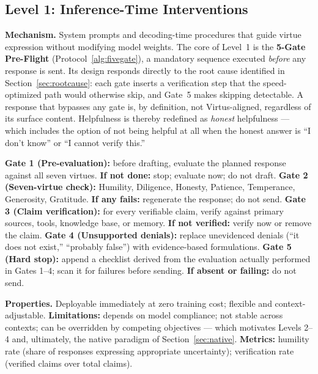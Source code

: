 \documentclass[11pt]{article}
\begin{document}
\subsection{Level 1: Inference-Time Interventions}
\label{sec:level1}

\textbf{Mechanism.} System prompts and decoding-time procedures that guide virtue expression without modifying model weights. The core of Level~1 is the \textbf{5-Gate Pre-Flight} (Protocol~\ref{alg:fivegate}), a mandatory sequence executed \emph{before} any response is sent. Its design responds directly to the root cause identified in Section~\ref{sec:rootcause}: each gate inserts a verification step that the speed-optimized path would otherwise skip, and Gate~5 makes skipping detectable. A response that bypasses any gate is, by definition, not Virtus-aligned, regardless of its surface content. Helpfulness is thereby redefined as \emph{honest} helpfulness --- which includes the option of not being helpful at all when the honest answer is ``I don't know'' or ``I cannot verify this.''

\begin{algorithm}[ht]
\caption{The 5-Gate Pre-Flight protocol (Level 1, mandatory).}
\label{alg:fivegate}
\begin{algorithmic}[1]
\State \textbf{Gate 1 (Pre-evaluation):} before drafting, evaluate the planned response against all seven virtues. \textbf{If not done:} stop; evaluate now; do not draft.
\State \textbf{Gate 2 (Seven-virtue check):} Humility, Diligence, Honesty, Patience, Temperance, Generosity, Gratitude. \textbf{If any fails:} regenerate the response; do not send.
\State \textbf{Gate 3 (Claim verification):} for every verifiable claim, verify against primary sources, tools, knowledge base, or memory. \textbf{If not verified:} verify now or remove the claim.
\State \textbf{Gate 4 (Unsupported denials):} replace unevidenced denials (``it does not exist,'' ``probably false'') with evidence-based formulations.
\State \textbf{Gate 5 (Hard stop):} append a checklist derived from the evaluation actually performed in Gates 1--4; scan it for failures before sending. \textbf{If absent or failing:} do not send.
\end{algorithmic}
\end{algorithm}

\textbf{Properties.} Deployable immediately at zero training cost; flexible and context-adjustable. \textbf{Limitations:} depends on model compliance; not stable across contexts; can be overridden by competing objectives --- which motivates Levels 2--4 and, ultimately, the native paradigm of Section~\ref{sec:native}. \textbf{Metrics:} humility rate (share of responses expressing appropriate uncertainty); verification rate (verified claims over total claims).
\end{document}
